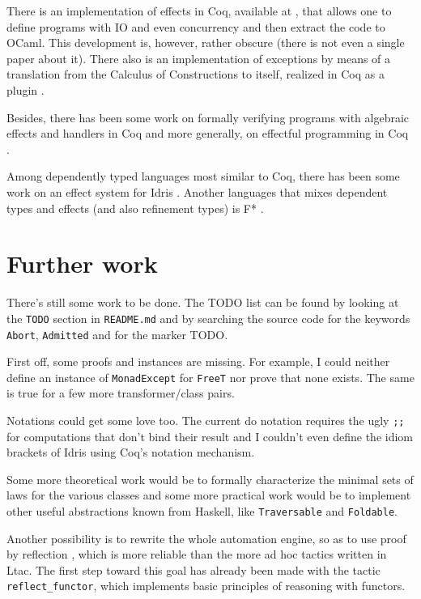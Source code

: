 \documentclass[declaration,inz,english,shortabstract]{iithesis}
\newcommand{\m}[1]{\texttt{#1}}
\begin{document}
There is an implementation of effects in Coq, available at \cite{CoqIO}, that allows one to define programs with IO and even concurrency and then extract the code to OCaml. This development is, however, rather obscure (there is not even a single paper about it). There also is an implementation of exceptions by means of a translation from the Calculus of Constructions to itself, realized in Coq as a plugin \cite{FailureIsNotAnOption}.

Besides, there has been some work on formally verifying programs with algebraic effects and handlers in Coq \cite{CoqEff1} \cite{CoqEff2} and more generally, on effectful programming in Coq \cite{CoqEff3}.

Among dependently typed languages most similar to Coq, there has been some work on an effect system for Idris \cite{IdrisEffects}. Another languages that mixes dependent types and effects (and also refinement types) is F* \cite{FStar}.

\section{Further work}

There's still some work to be done. The TODO list can be found by looking at the \m{TODO} section in \m{README.md} and by searching the source code for the keywords \m{Abort}, \m{Admitted} and for the marker TODO.

First off, some proofs and instances are missing. For example, I could neither define an instance of \m{MonadExcept} for \m{FreeT} nor prove that none exists. The same is true for a few more transformer/class pairs.

Notations could get some love too. The current do notation requires the ugly \m{;;} for computations that don't bind their result and I couldn't even define the idiom brackets of Idris using Coq's notation mechanism.

Some more theoretical work would be to formally characterize the minimal sets of laws for the various classes and some more practical work would be to implement other useful abstractions known from Haskell, like \m{Traversable} and \m{Foldable}.

Another possibility is to rewrite the whole automation engine, so as to use proof by reflection \cite{CPDT}, which is more reliable than the more ad hoc tactics written in Ltac. The first step toward this goal has already been made with the tactic \m{reflect\_functor}, which implements basic principles of reasoning with functors.
\end{document}
